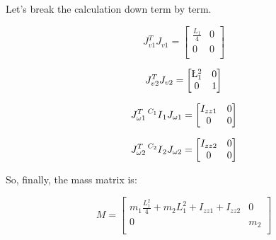 \documentclass{exam}
\begin{document}
\begin{questions}
\begin{parts}
Let's break the calculation down term by term.

\begin{equation}
  J_{v1}^T J_{v1} = \begin{bmatrix}
    \frac{L_1}{4} & 0 \\
    0             & 0 \\
                    \end{bmatrix}
\end{equation}

\begin{equation}
  J_{v2}^T J_{v2} = \begin{bmatrix}
    \L_1^2 & 0 \\
    0      & 1 \\
                    \end{bmatrix}
\end{equation}

\begin{equation}
  J_{\omega1}^T \prescript{C_1}{}I_1 J_{\omega1} =
    \begin{bmatrix}
      I_{zz1} & 0 \\
      0       & 0 \\
    \end{bmatrix}
\end{equation}

\begin{equation}
  J_{\omega2}^T \prescript{C_2}{}I_2 J_{\omega2} =
    \begin{bmatrix}
      I_{zz2} & 0 \\
      0       & 0 \\
    \end{bmatrix}
\end{equation}

So, finally, the mass matrix is:

\begin{equation}
  M = \begin{bmatrix}
    m_1\frac{L_1^2}{4} + m_{2}L_1^2 + I_{zz1} + I_{zz2} & 0   \\
    0                                                   & m_2 \\
      \end{bmatrix}
\end{equation}

\end{parts}

\end{questions}
\end{document}
